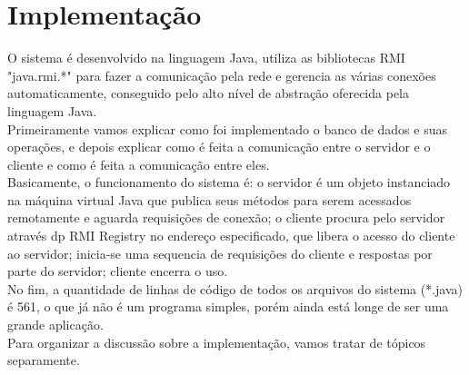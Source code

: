\documentclass[11pt,twoside]{article}
\begin{document}
\section{Implementação}
O sistema é desenvolvido na linguagem Java, utiliza as bibliotecas RMI "java.rmi.*" para fazer a comunicação pela rede e gerencia as várias conexões automaticamente, conseguido pelo alto nível de abstração oferecida pela linguagem Java.\\
Primeiramente vamos explicar como foi implementado o banco de dados e suas operações, e depois explicar como é feita a comunicação entre o servidor e o cliente e como é feita a comunicação entre eles.\\
Basicamente, o funcionamento do sistema é: o servidor é um objeto instanciado na máquina virtual Java que publica seus métodos para serem acessados remotamente e aguarda requisições de conexão; o cliente procura pelo servidor através dp RMI Registry no endereço especificado, que libera o acesso do cliente ao servidor; inicia-se uma sequencia de requisições do cliente e respostas por parte do servidor; cliente encerra o uso.\\

No fim, a quantidade de linhas de código de todos os arquivos do sistema (*.java) é 561, o que já não é um programa simples, porém ainda está longe de ser uma grande aplicação.\\

Para organizar a discussão sobre a implementação, vamos tratar de tópicos separamente.\\
\end{document}
